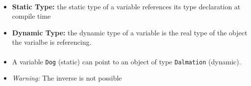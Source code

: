 \paragraph{}
\begin{itemize}
 \item \textbf{Static Type:} the static type of a variable references its type
declaration at compile time
\item \textbf{Dynamic Type:} the dynamic type of a variable is the real type of
the object the varialbe is referencing.
\end{itemize}

\paragraph{}
\begin{itemize}
 \item A variable \texttt{Dog} (static) can point to an object of type
\texttt{Dalmation} (dynamic).
\item \emph{Warning:} The inverse is not possible
\end{itemize}

